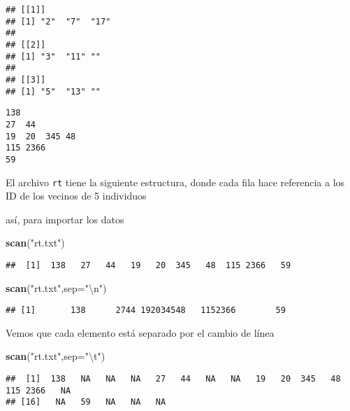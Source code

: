 \documentclass[]{article}
\newenvironment{Shaded}{\begin{snugshade}}{\end{snugshade}}
\newcommand{\KeywordTok}[1]{\textcolor[rgb]{0.13,0.29,0.53}{\textbf{#1}}}
\newcommand{\DataTypeTok}[1]{\textcolor[rgb]{0.13,0.29,0.53}{#1}}
\newcommand{\CharTok}[1]{\textcolor[rgb]{0.31,0.60,0.02}{#1}}
\newcommand{\StringTok}[1]{\textcolor[rgb]{0.31,0.60,0.02}{#1}}
\newcommand{\NormalTok}[1]{#1}
\begin{document}
\begin{verbatim}
## [[1]]
## [1] "2"  "7"  "17"
## 
## [[2]]
## [1] "3"  "11" ""  
## 
## [[3]]
## [1] "5"  "13" ""
\end{verbatim}

\begin{verbatim}
138         
27  44      
19  20  345 48
115 2366        
59
\end{verbatim}

El archivo \texttt{rt} tiene la siguiente estructura, donde cada fila
hace referencia a los ID de los vecinos de 5 individuos

así, para importar los datos

\begin{Shaded}
\begin{Highlighting}[]
\KeywordTok{scan}\NormalTok{(}\StringTok{"rt.txt"}\NormalTok{)}
\end{Highlighting}
\end{Shaded}

\begin{verbatim}
##  [1]  138   27   44   19   20  345   48  115 2366   59
\end{verbatim}

\begin{Shaded}
\begin{Highlighting}[]
\KeywordTok{scan}\NormalTok{(}\StringTok{"rt.txt"}\NormalTok{,}\DataTypeTok{sep=}\StringTok{"}\CharTok{\textbackslash{}n}\StringTok{"}\NormalTok{)}
\end{Highlighting}
\end{Shaded}

\begin{verbatim}
## [1]       138      2744 192034548   1152366        59
\end{verbatim}

Vemos que cada elemento está separado por el cambio de línea

\begin{Shaded}
\begin{Highlighting}[]
\KeywordTok{scan}\NormalTok{(}\StringTok{"rt.txt"}\NormalTok{,}\DataTypeTok{sep=}\StringTok{"}\CharTok{\textbackslash{}t}\StringTok{"}\NormalTok{)}
\end{Highlighting}
\end{Shaded}

\begin{verbatim}
##  [1]  138   NA   NA   NA   27   44   NA   NA   19   20  345   48  115 2366   NA
## [16]   NA   59   NA   NA   NA
\end{verbatim}
\end{document}
